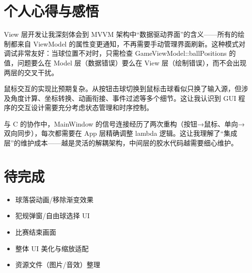\documentclass[11pt]{ctexart}
\begin{document}
\section{个人心得与感悟}

View 层开发让我深刻体会到 MVVM 架构中“数据驱动界面”的含义——所有的绘制都来自 ViewModel 的属性变更通知，不再需要手动管理界面刷新。这种模式对调试非常友好：当球位置不对时，只需检查 GameViewModel::ballPositions 的值，问题要么在 Model 层（数据错误）要么在 View 层（绘制错误），而不会出现两层的交叉干扰。

鼠标交互的实现比预期复杂。从按钮击球切换到鼠标击球看似只换了输入源，但涉及角度计算、坐标转换、动画衔接、事件过滤等多个细节。这让我认识到 GUI 程序的交互设计需要充分考虑状态管理和时序控制。

与 C 的协作中，MainWindow 的信号连接经历了两次重构（按钮→鼠标、单向→双向同步），每次都需要在 App 层精确调整 lambda 逻辑。这让我理解了“集成层”的维护成本——越是灵活的解耦架构，中间层的胶水代码越需要细心维护。

\section{待完成}

\begin{itemize}
\item 球落袋动画/移除渐变效果
\item 犯规弹窗/自由球选择 UI
\item 比赛结束画面
\item 整体 UI 美化与缩放适配
\item 资源文件（图片/音效）整理
\end{itemize}
\end{document}

